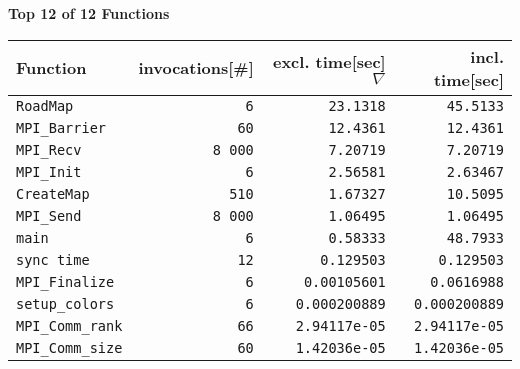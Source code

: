\documentclass[a4paper,10pt]{article}
\begin{document}
\newpage

\begin{center}\small
{\Large \bf Top 12 of 12 Functions}
\bigskip
\begin{longtable}{|l||r|r|r|}

   \hline
   \bf Function & \bf invocations[\#] & \bf excl. time[sec] $\nabla$ & \bf incl. time[sec] \\
   \hline\hline
  \verb|RoadMap| &   \verb|6| &   \verb|23.1318| &   \verb|45.5133| \\
  \verb|MPI_Barrier| &   \verb|60| &   \verb|12.4361| &   \verb|12.4361| \\
  \verb|MPI_Recv| &   \verb|8 000| &   \verb|7.20719| &   \verb|7.20719| \\
      \hline
  \verb|MPI_Init| &   \verb|6| &   \verb|2.56581| &   \verb|2.63467| \\
  \verb|CreateMap| &   \verb|510| &   \verb|1.67327| &   \verb|10.5095| \\
  \verb|MPI_Send| &   \verb|8 000| &   \verb|1.06495| &   \verb|1.06495| \\
      \hline
  \verb|main| &   \verb|6| &   \verb|0.58333| &   \verb|48.7933| \\
  \verb|sync time| &   \verb|12| &   \verb|0.129503| &   \verb|0.129503| \\
  \verb|MPI_Finalize| &   \verb|6| &   \verb|0.00105601| &   \verb|0.0616988| \\
      \hline
  \verb|setup_colors| &   \verb|6| &   \verb|0.000200889| &   \verb|0.000200889| \\
  \verb|MPI_Comm_rank| &   \verb|66| &   \verb|2.94117e-05| &   \verb|2.94117e-05| \\
  \verb|MPI_Comm_size| &   \verb|60| &   \verb|1.42036e-05| &   \verb|1.42036e-05| \\
   \hline
\end{longtable}

\end{center}
\newpage
\end{document}
